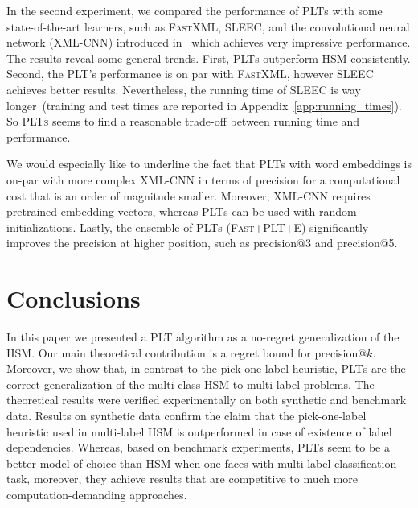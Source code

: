 \documentclass{article}
\newcommand{\Algo}[1]{\textsc{#1}}
\begin{document}
%
In the second experiment, we compared the performance of \Algo{PLT}s with some state-of-the-art learners, such as \Algo{FastXML}, \Algo{SLEEC}, and the convolutional neural network (\Algo{XML-CNN}) introduced in~\citep{Liu_et_al_2017} which achieves very impressive performance. %
The results reveal some general trends. First, \Algo{PLT}s outperform \Algo{HSM} consistently. Second, the \Algo{PLT}'s performance is on par with \Algo{FastXML}, however SLEEC achieves better results. Nevertheless, the running time of SLEEC is way longer~(training and test times are reported in Appendix~\ref{app:running_times}). So \Algo{PLTs} seems to find a reasonable trade-off between running time and performance.

We would especially like to underline the fact that \Algo{PLT}s with word embeddings is on-par with more complex \Algo{XML-CNN} in terms of precision for a computational cost that is an order of magnitude smaller. Moreover, \Algo{XML-CNN} requires pretrained embedding vectors, whereas \Algo{PLT}s can be used with random initializations.
%
Lastly, the ensemble of \Algo{PLT}s (\Algo{Fast+PLT+E}) significantly improves the precision at higher position, such as precision@3 and precision@5. 

\section{Conclusions}

In this paper we presented a \Algo{PLT} algorithm as a no-regret generalization of the \Algo{HSM}. Our main theoretical contribution is a regret bound for precision@$k$. Moreover, we show that, in contrast to the pick-one-label heuristic, \Algo{PLT}s are the correct generalization of the multi-class \Algo{HSM} to multi-label problems. The theoretical results were verified experimentally on both synthetic and benchmark data. Results on synthetic data confirm the claim that the pick-one-label heuristic used in multi-label \Algo{HSM} is outperformed in case of existence of label dependencies. Whereas, based on benchmark experiments, \Algo{PLT}s seem to be a better model of choice than \Algo{HSM} when one faces with multi-label classification task, moreover, they achieve results that are competitive to much more computation-demanding approaches. 

\end{document}
